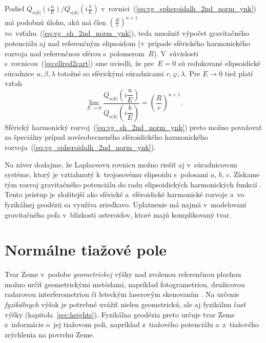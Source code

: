 \documentclass[a4paper, 12pt]{book}
\begin{document}
Podiel $Q_{n|k|}\left( i \frac{u}{E} \right) \slash Q_{n|k|}\left( 
i \frac{b}{E} \right)$ v~rovnici~(\ref{eq:vg_spheroidalh_2nd_norm_ynk}) má 
podobnú úlohu, akú má člen $\left( \frac{R}{r} \right)^{n + 1}$ 
vo~vzťahu~(\ref{eq:vg_sh_2nd_norm_ynk}), teda umožniť výpočet gravitačného 
potenciálu aj nad referenčným elipsoidom (v~prípade sférického harmonického 
rozvoja nad referenčnou sférou s~polomerom~$R$).  V~súvislosti 
s~rovnicou~(\ref{eq:ellred2cart}) sme uviedli, že pre~$E = 0$ sú redukované 
elipsoidické súradnice $u, \beta, \lambda$ totožné so sférickými súradnicami 
$r, \varphi, \lambda$.  Pre $E \rightarrow 0$ tiež platí vzťah 
\parencite{MoritzPhysicalGeodesy}
%
\begin{equation}
\lim_{E \rightarrow 0} \frac{Q_{n|k|}\left( i \dfrac{u}{E} 
\right)}{Q_{n|k|}\left( i \dfrac{b}{E} \right)} = \left( \frac{R}{r} \right)^{n 
+ 1}{.}
\end{equation}
%
Sférický harmonický rozvoj~(\ref{eq:vg_sh_2nd_norm_ynk}) preto možno považovať 
za špeciálny prípad zovšeobecneného sféroidického harmonického 
rozvoja~(\ref{eq:vg_spheroidalh_2nd_norm_ynk}).

Na záver dodajme, že Laplaceovu rovnicu možno riešiť aj v~súradnicovom systéme, 
ktorý je vztiahnutý k~trojosovému elipsoidu s~polosami $a$, $b$, $c$.  Získame 
tým rozvoj gravitačného potenciálu do radu elipsoidických harmonických funkcií 
\parencite[napríklad][]{Garmier2001,Hu2015,Reimond2016}.  Tento prístup je 
zložitejší ako sférické a~sféroidické harmonické rozvoje a~vo fyzikálnej 
geodézii sa využíva zriedkavo.  Uplatnenie má najmä v~modelovaní gravitačného 
poľa v~blízkosti asteroidov, ktoré majú komplikovaný tvar.










\chapter{Normálne tiažové pole}
\label{sec:normal_gravity_field}

Tvar Zeme v~podobe \emph{geometrickej} výšky nad zvolenou referenčnou plochou 
možno určiť geometrickými metódami, napríklad fotogrametriou, družicovou 
radarovou interferometriou či leteckým laserovým skenovaním \parencite[pozri 
napríklad][]{Hirt2014c}.  Na určenie \emph{fyzikálnych} výšok je potrebné 
uvážiť nielen geometrickú, ale aj fyzikálnu časť výšky 
(kapitola~\ref{sec:heights}).  Fyzikálna geodézia preto určuje tvar Zeme 
z~informácie o~jej tiažovom poli, napríklad z~tiažového potenciálu 
a~z~tiažového zrýchlenia na povrchu Zeme.
\end{document}
